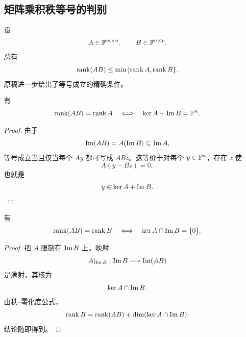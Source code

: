 \subsection{矩阵乘积秩等号的判别}

设
\begin{equation}
 A\in\mathbb F^{m\times n},
 \qquad
 B\in\mathbb F^{n\times p}.
\end{equation}
总有
\begin{equation}
 \operatorname{rank}(AB)\leq\min\{\operatorname{rank} A,\operatorname{rank} B\}.
\end{equation}
原稿进一步给出了等号成立的精确条件。

\begin{theorem}
有
\begin{equation}
 \operatorname{rank}(AB)=\operatorname{rank} A
 \quad\Longleftrightarrow\quad
 \operatorname{ker} A+\operatorname{Im} B=\mathbb F^n.
\end{equation}
\end{theorem}

\begin{proof}
由于
\begin{equation}
 \operatorname{Im}(AB)=A(\operatorname{Im} B)\subseteq\operatorname{Im} A,
\end{equation}
等号成立当且仅当每个 $Ay$ 都可写成 $ABz$。这等价于对每个 $y\in\mathbb F^n$，存在 $z$ 使
\begin{equation}
 A(y-Bz)=0,
\end{equation}
也就是
\begin{equation}
 y\in\operatorname{ker} A+\operatorname{Im} B.
\end{equation}
\end{proof}

\begin{theorem}
有
\begin{equation}
 \operatorname{rank}(AB)=\operatorname{rank} B
 \quad\Longleftrightarrow\quad
 \operatorname{ker} A\cap\operatorname{Im} B=\{0\}.
\end{equation}
\end{theorem}

\begin{proof}
把 $A$ 限制在 $\operatorname{Im} B$ 上。映射
\begin{equation}
 A|_{\operatorname{Im} B}:\operatorname{Im} B\longrightarrow\operatorname{Im}(AB)
\end{equation}
是满射，其核为
\begin{equation}
 \operatorname{ker} A\cap\operatorname{Im} B.
\end{equation}
由秩--零化度公式，
\begin{equation}
 \operatorname{rank} B=\operatorname{rank}(AB)+\dim(\operatorname{ker} A\cap\operatorname{Im} B).
\end{equation}
结论随即得到。
\end{proof}


